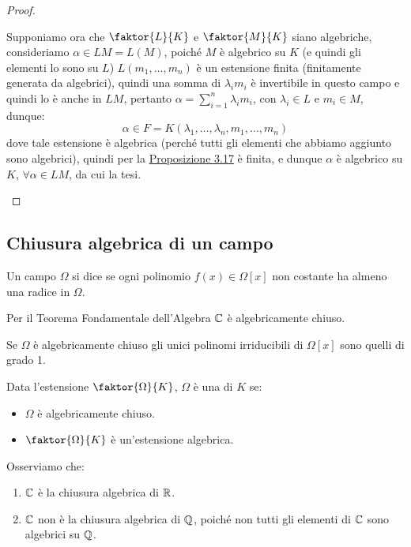 \documentclass[11pt]{scrartcl}
\begin{document}
\begin{proof}
\begin{enumerate}[(1)]
        Supponiamo ora che $\faktor{L}{K}$ e $\faktor{M}{K}$ siano algebriche, consideriamo $\alpha \in LM = L(M)$, poiché $M$ è algebrico su $K$ (e quindi gli elementi lo sono su $L$)  $L(m_1,\ldots,m_n)$ è un estensione finita (finitamente generata da algebrici), quindi una somma di $ \lambda_i m_i$ è invertibile in questo campo e quindi
        lo è anche in $LM$, pertanto $\alpha = \sum_{i=1}^{n} \lambda_i m_i$, con $\lambda_i \in L$ e $m_i \in M$, dunque:
         \[ \alpha \in F = K(\lambda_1,\ldots,\lambda_n,m_1,\ldots,m_n)
            \]
        dove tale estensione è algebrica (perché tutti gli elementi che abbiamo aggiunto sono algebrici), quindi per la \hyperref[3.17]{Proposizione 3.17} è finita,
        e dunque $\alpha$ è algebrico su $K$, $\forall \alpha \in LM$, da cui la tesi.
    \end{enumerate}
\end{proof}

\newpage
\subsection{Chiusura algebrica di un campo}
\begin{definition}
    Un campo $\Omega$ si dice  se ogni polinomio $f(x) \in \Omega[x]$ non costante ha almeno una radice in $\Omega$.
\end{definition}

\begin{example}
    Per il Teorema Fondamentale dell'Algebra $\mathbb C$ è algebricamente chiuso.
\end{example}

\begin{remark}
    Se $\Omega$ è algebricamente chiuso gli unici polinomi irriducibili di $\Omega[x]$ sono quelli di grado 1.
\end{remark}

\begin{definition}
    Data l'estensione $\faktor{\Omega}{K}$, $\Omega$ è una  di $K$ se:
    \begin{itemize}
        \item $\Omega$ è algebricamente chiuso.
        \item $\faktor{\Omega}{K}$ è un'estensione algebrica.
    \end{itemize}
\end{definition}

\begin{example}
    Osserviamo che:
    \begin{enumerate}[(1)]
        \item $\mathbb C$ è la chiusura algebrica di $\mathbb R$.
        \item $\mathbb C$ non è la chiusura algebrica di $\mathbb Q$, poiché non tutti gli elementi di $\mathbb C$ sono algebrici su $\mathbb Q$.
    \end{enumerate}
\end{example}
\end{document}

